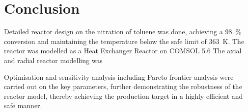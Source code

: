 \section{Conclusion} \label{sec:conclusion}
Detailed reactor design on the nitration of toluene was done, achieving a \SI{98}{\%} conversion and maintaining the temperature below the safe limit of \SI{363}{\K}. The reactor was modelled as a Heat Exchanger Reactor on COMSOL 5.6  
The axial and radial reactor modelling was 

Optimisation and sensitivity analysis including Pareto frontier analysis were carried out on the key parameters, further demonstrating the robustness of the reactor model, thereby achieving the production target in a highly efficient and safe manner.  